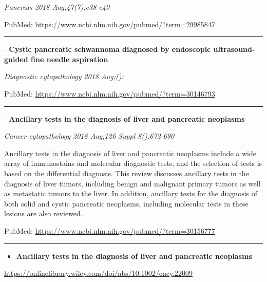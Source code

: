 \documentclass[]{article}
\providecommand{\tightlist}{%
  \setlength{\itemsep}{0pt}\setlength{\parskip}{0pt}}
\begin{document}
\emph{Pancreas 2018 Aug;47(7):e38-e40}

PubMed: \url{https://www.ncbi.nlm.nih.gov/pubmed/?term=29985847}

{}

{}

\begin{center}\rule{0.5\linewidth}{\linethickness}\end{center}

 - \textbf{Cystic pancreatic schwannoma diagnosed by endoscopic
ultrasound-guided fine needle aspiration}

\emph{Diagnostic cytopathology 2018 Aug;():}

PubMed: \url{https://www.ncbi.nlm.nih.gov/pubmed/?term=30146793}

{}

{}

\begin{center}\rule{0.5\linewidth}{\linethickness}\end{center}

 - \textbf{Ancillary tests in the diagnosis of liver and pancreatic
neoplasms}

\emph{Cancer cytopathology 2018 Aug;126 Suppl 8():672-690}

Ancillary tests in the diagnosis of liver and pancreatic neoplasms
include a wide array of immunostains and molecular diagnostic tests, and
the selection of tests is based on the differential diagnosis. This
review discusses ancillary tests in the diagnosis of liver tumors,
including benign and malignant primary tumors as well as metastatic
tumors to the liver. In addition, ancillary tests for the diagnosis of
both solid and cystic pancreatic neoplasms, including molecular tests in
these lesions are also reviewed.

PubMed: \url{https://www.ncbi.nlm.nih.gov/pubmed/?term=30156777}

{}

{}

\begin{center}\rule{0.5\linewidth}{\linethickness}\end{center}

\begin{itemize}
\tightlist
\item
  \textbf{Ancillary tests in the diagnosis of liver and pancreatic
  neoplasms}
\end{itemize}

\url{https://onlinelibrary.wiley.com/doi/abs/10.1002/cncy.22009}
\end{document}
